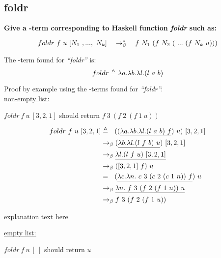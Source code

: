 \documentclass{article}
\begin{document}
	\begin{Large}
	\subsection{foldr}
		\textbf{Give a \lamb -term corresponding to Haskell function \textit{foldr} such as:}
		
		\begin{equation*}
			foldr \ f \ u \ [N_1 \ ,..., \ N_k] \quad \rightarrow_\beta^*\quad f \ N_1\ (f \ N_2 \ ( \ ... \ (f \ N_k \ u)))
		\end{equation*}
		\newline
		
		The \lamb -term found for \textit{``foldr''} is:
		\begin{equation*}
			foldr \triangleq \la a.\la b.\la l.(l \ a \ b)
		\end{equation*}
		\newline
		
		Proof by example using the \lamb -terms found for  \textit{``foldr''}:\\
		
		\underline{non-empty list:}
		\newline
		
		$foldr \ f \ u \ [3,2,1]$ should return $f \ 3 \ (f \ 2 \ (f \ 1 \ u))$
		
		\begin{align*}
			foldr \ f \ u \ [3,2,1] &\triangleq \saq ((\underline{\la a.\la b.\la l.(l \ a \ b) \ f}) \ u) \ [3,2,1] \\
			&\equals (\underline{\la b.\la l.(l \ f \ b) \ u}) \ [3,2,1] \\
			&\equals \underline{\la l.(l \ f \ u) \ [3,2,1]} \\
			&\equals  ([3,2,1] \ f) \ u \\
			&= \saq  (\underline{\la c.\la n. \ c \ 3 \ (c \ 2 \ (c \ 1 \ n)) \ f}) \ u \\
			&\equals \underline{\la n. \ f \ 3 \ (f \ 2 \ (f \ 1 \ n)) \ u} \\
			&\equals f \ 3 \ (f \ 2 \ (f \ 1 \ u))
		\end{align*}
		\newline
		
		explanation text here
		\newline
		
		\underline{empty list:}
		\newline
		
		$foldr \ f \ u \ [ \ ]$ should return $u$
		

\end{Large}
\end{document}
